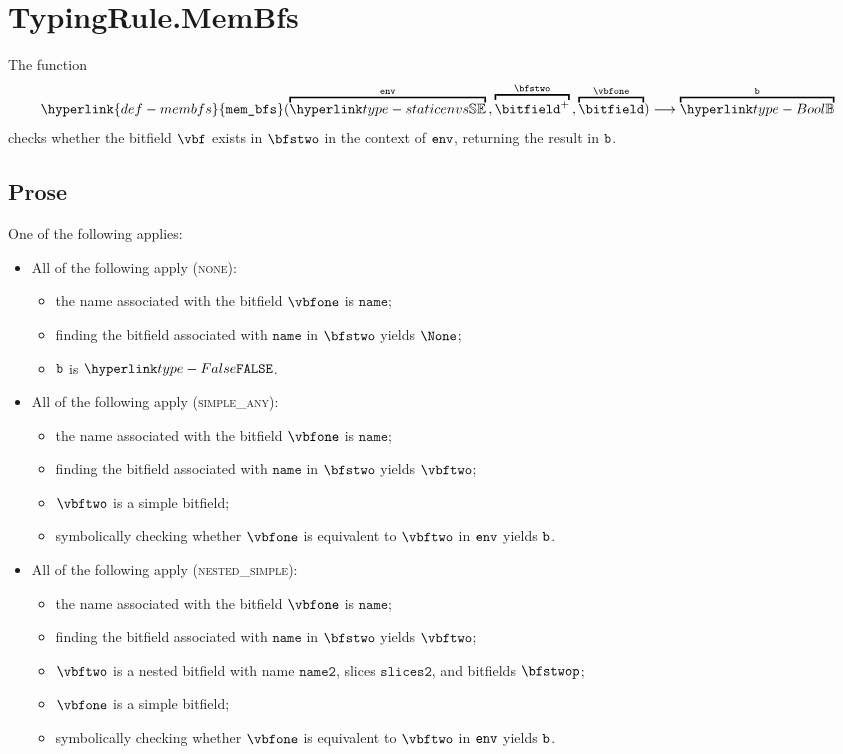 \documentclass{book}
\newcommand\membfs[0]{\hyperlink{def-membfs}{\texttt{mem\_bfs}}}
\newcommand\nametwo[0]{\texttt{name2}}
\newcommand\slicestwo[0]{\texttt{slices2}}
\newcommand\name[0]{\texttt{name}}
\begin{document}
\section{TypingRule.MemBfs}
\hypertarget{def-membfs}{}
The function
\[
  \membfs(\overname{\staticenvs}{\tenv} \aslsep \overname{\bitfield^+}{\bfstwo} \aslsep \overname{\bitfield}{\vbfone})
  \aslto \overname{\Bool}{\vb}
\]
checks whether the bitfield $\vbf$ exists in $\bfstwo$ in the context of $\texttt{env}$, returning the result in $\texttt{b}$.

\subsection{Prose}
One of the following applies:
\begin{itemize}
  \item All of the following apply (\textsc{none}):
  \begin{itemize}
    \item the name associated with the bitfield $\vbfone$ is $\name$;
    \item finding the bitfield associated with $\name$ in $\bfstwo$ yields $\None$;
    \item $\texttt{b}$ is $\False$.
  \end{itemize}

  \item All of the following apply (\textsc{simple\_any}):
  \begin{itemize}
    \item the name associated with the bitfield $\vbfone$ is $\name$;
    \item finding the bitfield associated with $\name$ in $\bfstwo$ yields $\vbftwo$;
    \item $\vbftwo$ is a simple bitfield;
    \item symbolically checking whether $\vbfone$ is equivalent to $\vbftwo$ in $\texttt{env}$ yields $\texttt{b}$.
  \end{itemize}

  \item All of the following apply (\textsc{nested\_simple}):
  \begin{itemize}
    \item the name associated with the bitfield $\vbfone$ is $\name$;
    \item finding the bitfield associated with $\name$ in $\bfstwo$ yields $\vbftwo$;
    \item $\vbftwo$ is a nested bitfield with name $\nametwo$, slices $\slicestwo$, and bitfields $\bfstwop$;
    \item $\vbfone$ is a simple bitfield;
    \item symbolically checking whether $\vbfone$ is equivalent to $\vbftwo$ in $\texttt{env}$ yields $\texttt{b}$.
  \end{itemize}


\end{itemize}
\end{document}
